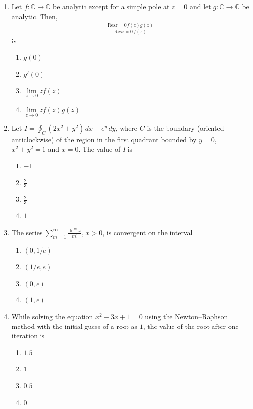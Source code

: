 \documentclass[journal]{IEEEtran}
\numberwithin{equation}{enumi}
\numberwithin{figure}{enumi}
\begin{document}
\begin{enumerate}
\item Let $f : \mathbb{C} \to \mathbb{C}$ be analytic except for a simple pole at $z=0$ and let $g : \mathbb{C} \to \mathbb{C}$ be analytic. Then,
\begin{align*}
\frac{\text{Res}{z=0} \, f(z) g(z)}{\text{Res}{z=0} \, f(z)}
\end{align*}
is
\hfill{}
\begin{multicols}{4}
\begin{enumerate}
    \item $g(0)$
    \item $g'(0)$
    \item $\lim\limits_{z \to 0} z f(z)$
    \item $\lim\limits_{z \to 0} z f(z) g(z)$
\end{enumerate}
\end{multicols}


\item Let $I = \oint_C (2x^2 + y^2) \, dx + e^y \, dy$, where $C$ is the boundary (oriented anticlockwise) of the region in the first quadrant bounded by $y = 0$, $x^2 + y^2 = 1$ and $x = 0$. The value of $I$ is
\hfill{}
\begin{multicols}{4}
\begin{enumerate}
    \item $-1$
    \item $\frac{2}{3}$
    \item $\frac{2}{3}$
    \item $1$
\end{enumerate}
\end{multicols}


\item The series $\sum\limits_{m=1}^{\infty} \frac{\ln^m x}{m!}, \, x > 0$, is convergent on the interval
\hfill{}
\begin{multicols}{4}
\begin{enumerate}
    \item $(0, 1/e)$
    \item $(1/e, e)$ 
    \item $(0, e)$
    \item $(1, e)$
\end{enumerate}
\end{multicols}


\item While solving the equation $x^2 - 3x + 1 = 0$ using the Newton--Raphson method with the initial guess of a root as $1$, the value of the root after one iteration is
\hfill{}
\begin{multicols}{4}
\begin{enumerate}
    \item $1.5$ 
    \item $1$
    \item  $0.5$
    \item $0$
\end{enumerate}
\end{multicols}





\end{enumerate}
\end{document}
